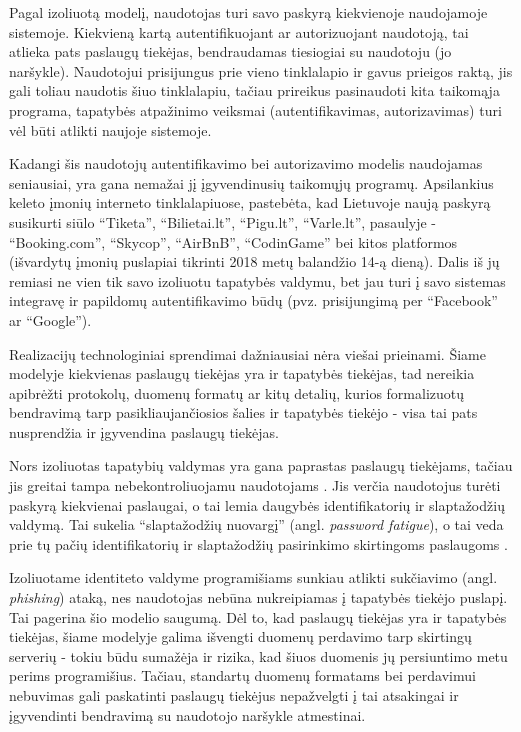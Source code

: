 Pagal izoliuotą modelį, naudotojas turi savo paskyrą kiekvienoje naudojamoje sistemoje. Kiekvieną kartą autentifikuojant ar autorizuojant
naudotoją, tai atlieka pats paslaugų tiekėjas, bendraudamas tiesiogiai su naudotoju (jo naršykle). Naudotojui prisijungus prie vieno tinklalapio ir gavus
prieigos raktą, jis gali toliau naudotis šiuo tinklalapiu, tačiau prireikus pasinaudoti kita taikomąja programa, tapatybės atpažinimo veiksmai (autentifikavimas, autorizavimas)
turi vėl būti atlikti naujoje sistemoje.


Kadangi šis naudotojų autentifikavimo bei autorizavimo modelis naudojamas seniausiai,
yra gana nemažai jį įgyvendinusių taikomųjų programų. Apsilankius keleto įmonių
interneto tinklalapiuose, pastebėta, kad Lietuvoje naują paskyrą susikurti siūlo
\enquote{Tiketa}, \enquote{Bilietai.lt}, \enquote{Pigu.lt},
\enquote{Varle.lt}, pasaulyje - \enquote{Booking.com}, \enquote{Skycop}, \enquote{AirBnB}, \enquote{CodinGame} bei kitos platformos (išvardytų
įmonių puslapiai tikrinti 2018 metų balandžio 14-ą dieną). Dalis iš jų remiasi ne vien tik savo izoliuotu tapatybės valdymu,
bet jau turi į savo sistemas integravę ir papildomų autentifikavimo būdų
(pvz. prisijungimą per \enquote{Facebook} ar \enquote{Google}).

Realizacijų technologiniai sprendimai dažniausiai nėra viešai prieinami.
Šiame modelyje kiekvienas paslaugų tiekėjas yra ir tapatybės tiekėjas, tad nereikia
apibrėžti protokolų, duomenų formatų ar kitų detalių, kurios formalizuotų bendravimą tarp pasikliaujančiosios šalies ir
tapatybės tiekėjo - visa tai pats nusprendžia ir įgyvendina paslaugų tiekėjas.


Nors izoliuotas tapatybių valdymas yra gana paprastas paslaugų tiekėjams, tačiau jis greitai tampa
nebekontroliuojamu naudotojams \cite{Josang2005}. Jis verčia naudotojus turėti paskyrą kiekvienai paslaugai, o tai lemia
daugybės identifikatorių ir slaptažodžių valdymą. Tai sukelia \enquote{slaptažodžių nuovargį} (angl. 
\textit{password fatigue}), o tai veda prie tų pačių identifikatorių ir slaptažodžių pasirinkimo skirtingoms paslaugoms \cite{Dhamija2008}.

Izoliuotame identiteto valdyme programišiams sunkiau atlikti sukčiavimo (angl. \textit{phishing}) ataką, nes naudotojas
nebūna nukreipiamas į tapatybės tiekėjo puslapį. Tai pagerina šio modelio saugumą. Dėl to, kad paslaugų tiekėjas yra ir tapatybės tiekėjas,
šiame modelyje galima išvengti duomenų perdavimo tarp skirtingų serverių - tokiu būdu sumažėja ir rizika, kad šiuos duomenis
jų persiuntimo metu perims programišius. Tačiau, standartų duomenų formatams bei perdavimui nebuvimas gali paskatinti paslaugų
tiekėjus nepažvelgti į tai atsakingai ir įgyvendinti bendravimą su naudotojo naršykle atmestinai.

